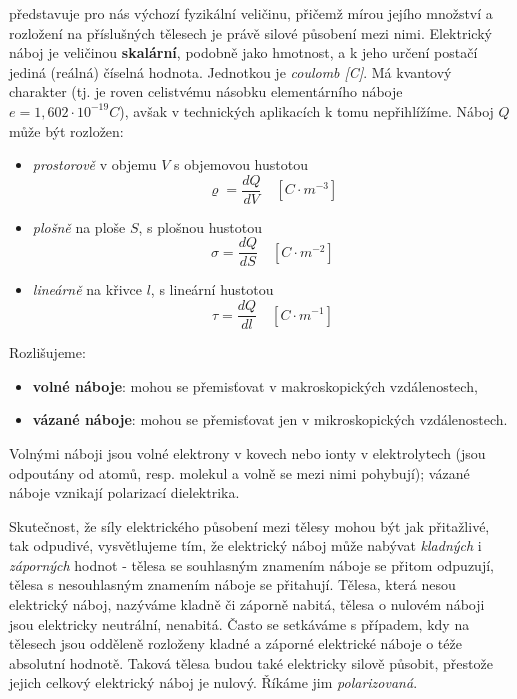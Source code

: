        představuje pro nás výchozí fyzikální veličinu, přičemž mírou jejího
      množství a rozložení na příslušných tělesech je právě silové působení mezi nimi. Elektrický
      náboj je veličinou \textbf{skalární}, podobně jako hmotnost, a k jeho určení postačí jediná
      (reálná) číselná hodnota. Jednotkou je \emph{coulomb [C]}. Má kvantový charakter (tj. je roven
      celistvému násobku elementárního náboje $e = 1,602\cdot10^{-19}C$), avšak v technických
      aplikacích k tomu nepřihlížíme. Náboj $Q$ může být rozložen:
      \begin{itemize}[noitemsep]
        \item \emph{prostorově} v objemu $V$ s objemovou hustotou
            \begin{equation}\label{TEMP:eq_q_varrho}
              \varrho = \frac{dQ}{dV} \quad [C\cdot m^{-3}]
            \end{equation}               
        \item \emph{plošně} na ploše $S$, s plošnou hustotou
            \begin{equation}\label{TEMP:eq_q_sigma}
              \sigma = \frac{dQ}{dS} \quad [C\cdot m^{-2}]
            \end{equation}                 
        \item \emph{lineárně} na křivce $l$, s lineární hustotou
            \begin{equation}\label{TEMP:eq_q_tau}
              \tau = \frac{dQ}{dl} \quad [C\cdot m^{-1}]
            \end{equation}                 
      \end{itemize}
      Rozlišujeme:
        \begin{itemize}[noitemsep]
          \item \textbf{volné náboje}: mohou se přemisťovat v makroskopických vzdálenostech,
          \item \textbf{vázané náboje}: mohou se přemisťovat jen v mikroskopických vzdálenostech.
        \end{itemize}
      Volnými náboji jsou volné elektrony v kovech nebo ionty v elektrolytech (jsou odpoutány od
      atomů, resp. molekul a volně se mezi nimi pohybují); vázané náboje vznikají polarizací
      dielektrika.    
      
      Skutečnost, že síly elektrického působení mezi tělesy mohou být jak přitažlivé, tak odpudivé,
      vysvětlujeme tím, že elektrický náboj může nabývat \emph{kladných} i \emph{záporných} hodnot -
      tělesa se souhlasným znamením náboje se přitom odpuzují, tělesa s nesouhlasným znamením náboje
      se přitahují. Tělesa, která nesou elektrický náboj, nazýváme kladně či záporně nabitá, tělesa
      o nulovém náboji jsou elektricky neutrální, nenabitá. Často se setkáváme s případem, kdy na
      tělesech jsou odděleně rozloženy kladné a záporné elektrické náboje o téže absolutní hodnotě.
      Taková tělesa budou také elektricky silově působit, přestože jejich celkový elektrický náboj
      je nulový. Říkáme jim \emph{polarizovaná}. 
      
